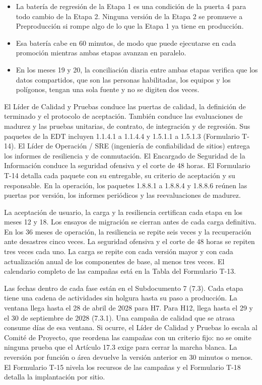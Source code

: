 \documentclass[subdoc]{../../comun/overfore}
\begin{document}
\begin{itemize}
\item La batería de regresión de la Etapa 1 es una condición de la puerta 4 para todo cambio de la Etapa 2. Ninguna versión de la Etapa 2 se promueve a Preproducción si rompe algo de lo que la Etapa 1 ya tiene en producción.
\item Esa batería cabe en 60 minutos, de modo que puede ejecutarse en cada promoción mientras ambas etapas avanzan en paralelo.
\item En los meses 19 y 20, la conciliación diaria entre ambas etapas verifica que los datos compartidos, que son las personas habilitadas, los equipos y los polígonos, tengan una sola fuente y no se digiten dos veces.
\end{itemize}

El Líder de Calidad y Pruebas conduce las puertas de calidad, la definición de terminado y el protocolo de aceptación. También conduce las evaluaciones de madurez y las pruebas unitarias, de contrato, de integración y de regresión. Sus paquetes de la EDT incluyen 1.1.4.1 a 1.1.4.4 y 1.5.1.1 a 1.5.1.3 (Formulario T-14). El Líder de Operación / SRE (ingeniería de confiabilidad de sitios) entrega los informes de resiliencia y de conmutación. El Encargado de Seguridad de la Información conduce la seguridad ofensiva y el corte de 48 horas. El Formulario T-14 detalla cada paquete con su entregable, su criterio de aceptación y su responsable. En la operación, los paquetes 1.8.8.1 a 1.8.8.4 y 1.8.8.6 reúnen las puertas por versión, los informes periódicos y las reevaluaciones de madurez.

La aceptación de usuario, la carga y la resiliencia certifican cada etapa en los meses 12 y 18. Los ensayos de migración se cierran antes de cada carga definitiva. En los 36 meses de operación, la resiliencia se repite seis veces y la recuperación ante desastres cinco veces. La seguridad ofensiva y el corte de 48 horas se repiten tres veces cada uno. La carga se repite con cada versión mayor y con cada actualización anual de los componentes de base, al menos tres veces. El calendario completo de las campañas está en la Tabla  del Formulario T-13.

Las fechas dentro de cada fase están en el Subdocumento 7 (7.3). Cada etapa tiene una cadena de actividades sin holgura hasta su paso a producción. La ventana llega hasta el 28 de abril de 2028 para H7. Para H12, llega hasta el 29 y el 30 de septiembre de 2028 (7.3.1). Una campaña de calidad que se atrasa consume días de esa ventana. Si ocurre, el Líder de Calidad y Pruebas lo escala al Comité de Proyecto, que reordena las campañas con un criterio fijo: no se omite ninguna prueba que el Artículo 17.3 exige para cerrar la marcha blanca. La reversión por función o área devuelve la versión anterior en 30 minutos o menos. El Formulario T-15 nivela los recursos de las campañas y el Formulario T-18 detalla la implantación por sitio.
\end{document}
